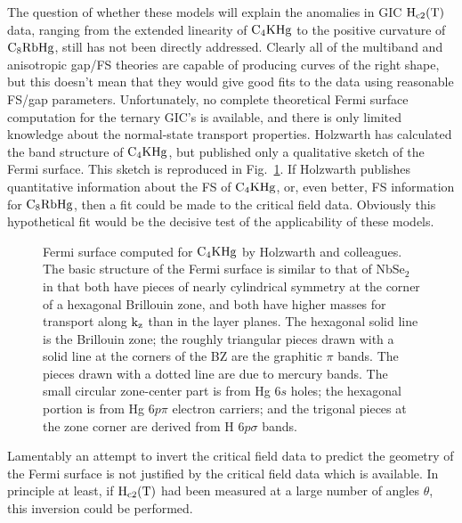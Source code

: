         The question of whether these models  will explain the anomalies in
GIC  $\rm H_{c2}(T)$  data, ranging  from  the extended linearity  of  $\rm
C_4KHg$ to  the  positive  curvature of $\rm  C_8RbHg$, still  has not been
directly addressed.  Clearly  all of the multiband and   anisotropic gap/FS
theories  are capable of   producing  curves of the  right  shape, but this
doesn't mean that they would  give good  fits to  the data using reasonable
FS/gap parameters.  Unfortunately,  no complete  theoretical Fermi  surface
computation  for the ternary GIC's is   available, and  there  is only
limited   knowledge  about    the   normal-state    transport   properties.
Holzwarth\cite{holzwarth88} has  calculated  the   band structure  of  $\rm
C_4KHg$,  but published  only  a qualitative sketch  of the  Fermi surface.
This sketch  is reproduced in  Fig.~\ref{holzfs}.   If Holzwarth  publishes
quantitative information about the FS of $\rm C_4KHg$, or,  even better, FS
information for  $\rm C_8RbHg$, then a  fit could be made  to  the critical
field data.  Obviously this hypothetical fit would be the decisive  test of
the applicability of these models.

\begin{figure}
\vspace{5in}
\caption[Fermi surface com\-pu\-ted for $\rm C_4KHg$ by Holz\-warth and
col\-leagues.]{Fermi  surface  com\-pu\-ted  for $\rm  C_4KHg$  by  Holz\-warth and
colleagues.\cite{holzwarth88} The  basic structure of  the Fermi surface is
similar to that of NbSe$_2$\cite{dalrymple84}  in  that both have pieces of
nearly  cylindrical symmetry at the  corner of  a hexagonal Brillouin zone,
and both have higher masses for transport along $\rm k_z$ than in the layer
planes.   The  hexagonal solid line   is   the Brillouin zone;  the roughly
triangular pieces drawn with a solid line at the  corners of the BZ are the
graphitic $\pi$ bands.    The pieces  drawn with a  dotted line  are due  to
mercury bands.  The small circular zone-center part is from  Hg 6$s$ holes;
the  hexagonal  portion  is  from  Hg 6$p\pi$   electron carriers; and  the
trigonal pieces at the zone corner are derived from H 6$p\sigma$ bands.}
\label{holzfs}
\end{figure}

        Lamentably an attempt to invert the critical  field data to predict
the geometry  of the Fermi  surface is not justified  by the critical field
data  which  is available.  In principle  at  least, if $\rm H_{c2}(T)$ had
been measured at a large number of angles $\theta$, this inversion could be
performed.  

